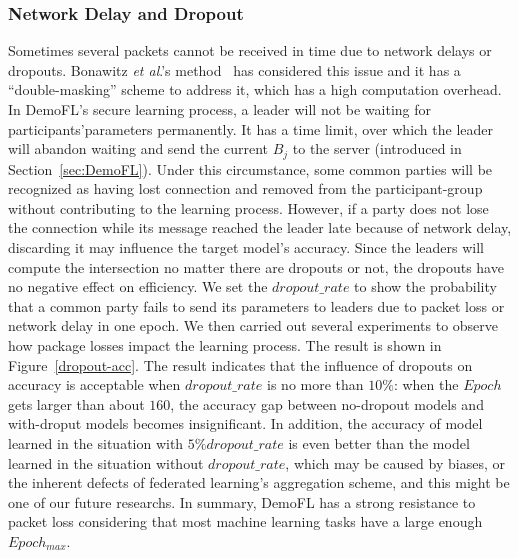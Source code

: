 \subsubsection{Network Delay and Dropout}
Sometimes several packets cannot be received in time due to network delays or dropouts. Bonawitz \emph{et al}.'s method~\cite{Practical} has considered this issue and it has a ``double-masking'' scheme to address it, which has a high computation overhead. In DemoFL's secure learning process, a leader will not be waiting for participants'parameters permanently. It has a time limit, over which the leader will abandon waiting and send the current $B_j$ to the server (introduced in Section~\ref{sec:DemoFL}). Under this circumstance, some common parties will be recognized as having lost connection and removed from the participant-group without contributing to the learning process. However, if a party does not lose the connection while its message reached the leader late because of network delay, discarding it may influence the target model's accuracy. Since the leaders will compute the intersection no matter there are dropouts or not, the dropouts have no negative effect on efficiency. We set the $dropout\_rate$ to show the probability that a common party fails to send its parameters to leaders due to packet loss or network delay in one epoch. We then carried out several experiments to observe how package losses impact the learning process. The result is shown in Figure~\ref{dropout-acc}. The result indicates that the influence of dropouts on accuracy is acceptable when $dropout\_rate$ is no more than $10\%$: when the $Epoch$ gets larger than about $160$, the accuracy gap between no-dropout models and with-droput models becomes insignificant. In addition, the accuracy of model learned in the situation with $5\% dropout\_rate$ is even better than the model learned in the situation without $dropout\_rate$,  which may be caused by biases, or the inherent defects of federated learning's aggregation scheme, and this might be one of our future researchs. In summary, DemoFL has a strong resistance to packet loss considering that most machine learning tasks have a large enough $Epoch_{max}$.